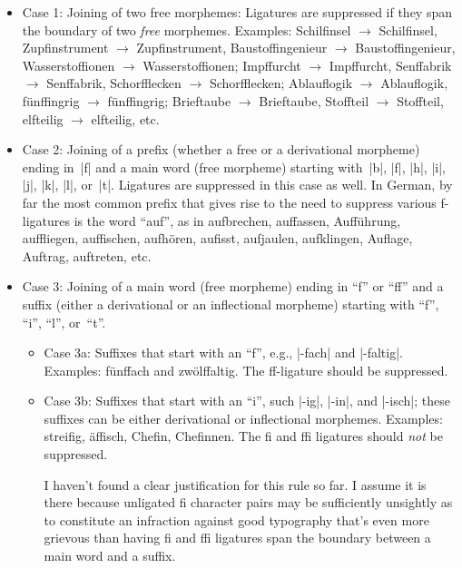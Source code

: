 \documentclass[11pt]{article}
\begin{document}
\begin{itemize}
\item Case 1: Joining of two free morphemes: Ligatures are suppressed if they span the boundary of two \emph{free} morphemes. Examples: Schil\mbox{fi}nsel $\to$ Schilfinsel, Zup\mbox{fi}nstrument $\to$ Zupfinstrument, Bausto\mbox{ffi}ngenieur $\to$ Baustoffingenieur, Wassersto\mbox{ffi}onen $\to$ Wasserstoffionen; Imp\mbox{ff}urcht $\to$ Impffurcht, Sen\mbox{ff}abrik $\to$ Senffabrik, Schor\mbox{ffl}ecken $\to$ Schorfflecken; Ablau\mbox{fl}ogik $\to$ Ablauflogik,  fün\mbox{ffi}ngrig $\to$ fünffingrig; Brie\mbox{ft}aube $\to$ Brieftaube, Sto\mbox{fft}eil $\to$ Stoffteil, el\mbox{ft}eilig $\to$ elfteilig, etc.

\item Case 2: Joining of a prefix (whether a free or a derivational morpheme) ending in~|f| and a main word (free morpheme) starting with~|b|, |f|, |h|, |i|, |j|, |k|, |l|, or~|t|. Ligatures are suppressed in this case as well. In German, by far the most common prefix that gives rise to the need to suppress various f-ligatures is the word \enquote{auf}, as in aufbrechen, auffassen, Aufführung, auffliegen, auffischen, aufhören, aufisst, aufjaulen, aufklingen, Auflage, Auftrag, auftreten, etc.

\item Case 3: Joining of a main word (free morpheme) ending in \enquote{f} or \enquote{ff} and a suffix (either a derivational or an inflectional morpheme) starting with \enquote{f}, \enquote{i}, \enquote{l}, or~\enquote{t}.

\begin{itemize}
\item Case 3a: Suffixes that start with an \enquote{f}, e.g., |-fach| and |-faltig|. Examples: fünffach and zwölffaltig. The ff-ligature should be suppressed. 

\item Case 3b: Suffixes that start with an \enquote{i}, such |-ig|, |-in|, and |-isch|; these suffixes can be either derivational or inflectional morphemes. Examples: streifig, äffisch, Chefin, Chefinnen. The fi and ffi ligatures should \emph{not} be suppressed. 

I haven't found a clear justification for this rule so far. I assume it is there because unligated f\breaklig i character pairs may be sufficiently unsightly as to constitute an infraction against good typography that's even more grievous than having fi and ffi ligatures span the boundary between a main word and a suffix.



\end{itemize}
\end{itemize}
\end{document}
